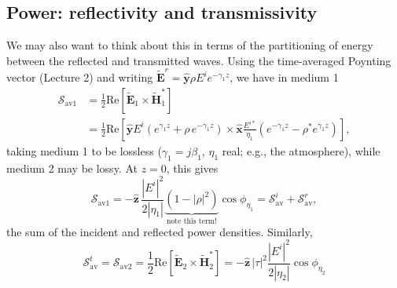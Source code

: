 \documentclass[11pt, oneside]{article}
\begin{document}
\subsection{Power: reflectivity and transmissivity}

We may also want to think about this in terms of the partitioning of energy between the reflected and transmitted waves. Using the time-averaged Poynting vector (Lecture 2) and writing $\tilde{\mathbf{E}}^r = \hat{\mathbf{y}}\rho E^i e^{-\gamma_1 z}$, we have in medium 1
\begin{align}
	\boldsymbol{\mathcal{S}}_{\mathrm{av}1} &= \frac{1}{2}\mathrm{Re}\left[\tilde{\mathbf{E}}_1\times\tilde{\mathbf{H}}_1^*\right] \nonumber\\
	&= \frac{1}{2}\mathrm{Re}\left[\hat{\mathbf{y}}E^i\left(e^{\gamma_1 z} + \rho\,e^{-\gamma_1 z}\right)\times\hat{\mathbf{x}}\frac{E^{i*}}{\eta_1}\left(e^{-\gamma_1 z} - \rho^*e^{\gamma_1 z}\right)\right],
\end{align}
taking medium 1 to be lossless ($\gamma_1 = j\beta_1$, $\eta_1$ real; e.g., the atmosphere), while medium 2 may be lossy. At $z = 0$, this gives
\begin{equation}
	\boldsymbol{\mathcal{S}}_{\mathrm{av}1} = -\hat{\mathbf{z}}\,\frac{|E^i|^2}{2|\eta_1|}\underbrace{\left(1 - |\rho|^2\right)}_{\text{note this term!}}\cos\phi_{\eta_1}
	= \boldsymbol{\mathcal{S}}^i_\mathrm{av} + \boldsymbol{\mathcal{S}}^r_\mathrm{av},
\end{equation}
the sum of the incident and reflected power densities. Similarly,
\begin{equation}
	\boldsymbol{\mathcal{S}}^t_\mathrm{av} = \boldsymbol{\mathcal{S}}_{\mathrm{av}2} = \frac{1}{2}\mathrm{Re}\left[\tilde{\mathbf{E}}_2\times\tilde{\mathbf{H}}_2^*\right]
	= -\hat{\mathbf{z}}\,|\tau|^2\frac{|E^i|^2}{2|\eta_2|}\cos\phi_{\eta_2}
\end{equation}
\end{document}
